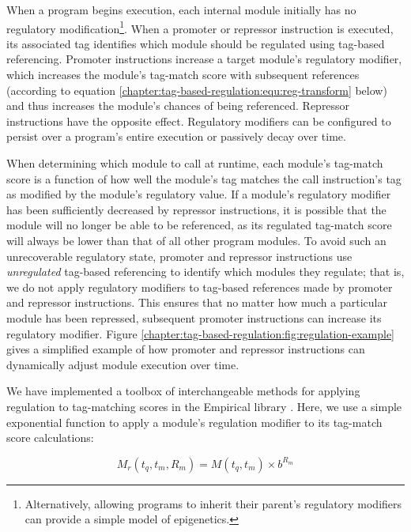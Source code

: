 When a program begins execution, each internal module initially has no regulatory modification\footnote{
    Alternatively, allowing programs to inherit their parent's regulatory modifiers can provide a simple model of epigenetics.
}.
When a promoter or repressor instruction is executed, its associated tag identifies which module should be regulated using tag-based referencing.
Promoter instructions increase a target module's regulatory modifier, which increases the module's tag-match score with subsequent references (according to equation \ref{chapter:tag-based-regulation:equ:reg-transform} below) and thus increases the module's chances of being referenced.
Repressor instructions have the opposite effect.
Regulatory modifiers can be configured to persist over a program's entire execution or passively decay over time.

When determining which module to call at runtime, each module's tag-match score is a function of how well the module's tag matches the call instruction's tag as modified by the module's regulatory value.
If a module's regulatory modifier has been sufficiently decreased by repressor instructions, it is possible that the module will no longer be able to be referenced, as its regulated tag-match score will always be lower than that of all other program modules. 
To avoid such an unrecoverable regulatory state, promoter and repressor instructions use \textit{unregulated} tag-based referencing to identify which modules they regulate; that is, we do not apply regulatory modifiers to tag-based references made by promoter and repressor instructions. 
This ensures that no matter how much a particular module has been repressed, subsequent promoter instructions can increase its regulatory modifier.
Figure \ref{chapter:tag-based-regulation:fig:regulation-example} gives a simplified example of how promoter and repressor instructions can dynamically adjust module execution over time.

We have implemented a toolbox of interchangeable methods for applying regulation to tag-matching scores in the Empirical library \citep{charles_ofria_2020_empirical}. 
Here, we use a simple exponential function to apply a module's regulation modifier to its tag-match score calculations: 

\begin{equation}
M_{r}(t_q, t_m, R_m) = M(t_q, t_m) \times b^{R_m}
\label{chapter:tag-based-regulation:equ:reg-transform}
\end{equation}

